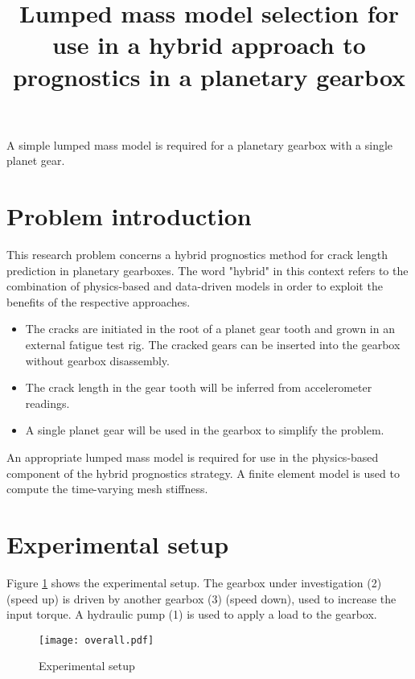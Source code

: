\documentclass[]{article}
\title{Lumped mass model selection for use in a hybrid approach to prognostics in a planetary gearbox}
\author{}
\begin{document}
	
	\maketitle
	
	
	A simple lumped mass model is required for a planetary gearbox with a single planet gear.
	
	\section*{Problem introduction}
	
	This research problem concerns a hybrid prognostics method for crack length prediction in planetary gearboxes. The word "hybrid" in this context refers to the combination of physics-based and data-driven models in order to exploit the benefits of the respective approaches.
	
	\begin{itemize}
		\item The cracks are initiated in the root of a planet gear tooth and grown in an external fatigue test rig. The cracked gears can be inserted into the gearbox without gearbox disassembly.
		\item The crack length in the gear tooth will be inferred from accelerometer readings.
		\item A single planet gear will be used in the gearbox to simplify the problem.
	\end{itemize}
	
	An appropriate lumped mass model is required for use in the physics-based component of the hybrid prognostics strategy. A finite element model is used to compute the time-varying mesh stiffness.
	
	
	\section*{Experimental setup}
	Figure \ref{f:overall} shows the experimental setup. The gearbox under investigation (2) (speed up)  is driven by another gearbox (3) (speed down), used to increase the input torque. A hydraulic pump (1) is used to apply a load to the gearbox.
	
	
	\begin{figure}[H]
		\hspace*{-2cm} 
		\texttt{[image: overall.pdf]}
		\caption{Experimental setup}
		\label{f:overall}
	\end{figure}
	
\end{document}
